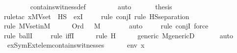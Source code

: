 \begin{isabellebody}
\ \ \ \ \ \ \isamarkupfalse%
\ contains{\isacharunderscore}{\kern0pt}witness{\isacharunderscore}{\kern0pt}def\ \isanewline
\ \ \ \ \ \ \isamarkupfalse%
\ auto\isanewline
\ \ \isamarkupfalse%
\isanewline
\isanewline
\ \ \isamarkupfalse%
\ {\isacharquery}{\kern0pt}thesis\ \isanewline
\ \ \ \ \isamarkupfalse%
{\isacharparenleft}{\kern0pt}rule{\isacharunderscore}{\kern0pt}tac\ x{\isacharequal}{\kern0pt}{\isachardoublequoteopen}MVset{\isacharparenleft}{\kern0pt}{\isasymalpha}{\isacharparenright}{\kern0pt}\ {\isasyminter}\ HS{\isachardoublequoteclose}\ \ exI{\isacharparenright}{\kern0pt}\isanewline
\ \ \ \ \isamarkupfalse%
{\isacharparenleft}{\kern0pt}rule\ conjI{\isacharcomma}{\kern0pt}\ rule\ HS{\isacharunderscore}{\kern0pt}separation{\isacharparenright}{\kern0pt}\isanewline
\ \ \ \ \isamarkupfalse%
{\isacharparenleft}{\kern0pt}rule\ MVset{\isacharunderscore}{\kern0pt}in{\isacharunderscore}{\kern0pt}M{\isacharparenright}{\kern0pt}\isanewline
\ \ \ \ \isamarkupfalse%
\ {\isacartoucheopen}Ord{\isacharparenleft}{\kern0pt}{\isasymalpha}{\isacharparenright}{\kern0pt}{\isacartoucheclose}\ {\isacartoucheopen}{\isasymalpha}\ {\isasymin}\ M{\isacartoucheclose}\isanewline
\ \ \ \ \ \ \isamarkupfalse%
\ auto{\isacharbrackleft}{\kern0pt}{}{\isacharbrackright}{\kern0pt}\isanewline
\ \ \ \ \isamarkupfalse%
{\isacharparenleft}{\kern0pt}rule\ conjI{\isacharcomma}{\kern0pt}\ force{\isacharparenright}{\kern0pt}\isanewline
\ \ \ \ \isamarkupfalse%
{\isacharparenleft}{\kern0pt}rule\ ballI{\isacharparenright}{\kern0pt}{\isacharplus}{\kern0pt}\isanewline
\ \ \ \ \isamarkupfalse%
{\isacharparenleft}{\kern0pt}rule\ iffI{\isacharparenright}{\kern0pt}\isanewline
\ \ \ \ \ \isamarkupfalse%
{\isacharparenleft}{\kern0pt}rule\ H{\isacharparenright}{\kern0pt}\isanewline
\ \ \ \ \isamarkupfalse%
\ generic\ M{\isacharunderscore}{\kern0pt}genericD\ \isanewline
\ \ \ \ \isamarkupfalse%
\ auto\isanewline
{}\isamarkupfalse%
%
\endisatagproof
{\isafoldproof}%
%
\isadelimproof
\isanewline
%
\endisadelimproof
\isanewline
{}\isamarkupfalse%
\ ex{\isacharunderscore}{\kern0pt}SymExt{\isacharunderscore}{\kern0pt}elem{\isacharunderscore}{\kern0pt}contains{\isacharunderscore}{\kern0pt}witnesses\ {\isacharcolon}{\kern0pt}\ \isanewline
\ \ \ {\isasymphi}\ env\ x\ \isanewline

\end{isabellebody}
